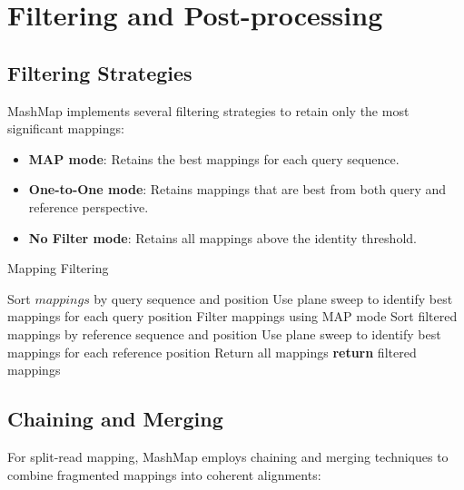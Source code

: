 \documentclass{article}
\begin{document}
\section{Filtering and Post-processing}

\subsection{Filtering Strategies}

MashMap implements several filtering strategies to retain only the most significant mappings:

\begin{itemize}
    \item \textbf{MAP mode}: Retains the best mappings for each query sequence.
    
    \item \textbf{One-to-One mode}: Retains mappings that are best from both query and reference perspective.
    
    \item \textbf{No Filter mode}: Retains all mappings above the identity threshold.
\end{itemize}

\begin{algorithm}
\caption{Mapping Filtering}
\begin{algorithmic}[1]
    \State Sort $mappings$ by query sequence and position
    \State Use plane sweep to identify best mappings for each query position
    \State Filter mappings using MAP mode
    \State Sort filtered mappings by reference sequence and position
    \State Use plane sweep to identify best mappings for each reference position
    \State Return all mappings
\EndIf
\State \textbf{return} filtered mappings
\EndProcedure
\end{algorithmic}
\end{algorithm}

\subsection{Chaining and Merging}

For split-read mapping, MashMap employs chaining and merging techniques to combine fragmented mappings into coherent alignments:
\end{document}
